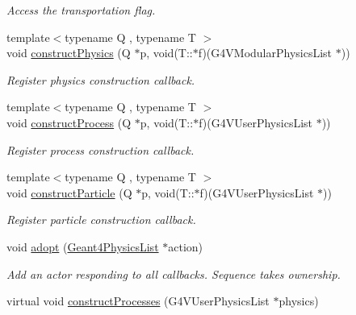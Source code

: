 \begin{DoxyCompactItemize}
\begin{DoxyCompactList}\small\item\em Access the transportation flag. \end{DoxyCompactList}\item 
{\footnotesize template$<$typename Q , typename T $>$ }\\void \hyperlink{class_d_d4hep_1_1_simulation_1_1_geant4_physics_list_action_sequence_a14bd3491087a274666b7d87f148f869c}{construct\+Physics} (Q $\ast$p, void(T\+::$\ast$f)(G4\+V\+Modular\+Physics\+List $\ast$))
\begin{DoxyCompactList}\small\item\em Register physics construction callback. \end{DoxyCompactList}\item 
{\footnotesize template$<$typename Q , typename T $>$ }\\void \hyperlink{class_d_d4hep_1_1_simulation_1_1_geant4_physics_list_action_sequence_a589bbee3287612e519fa1ebfac9a0492}{construct\+Process} (Q $\ast$p, void(T\+::$\ast$f)(G4\+V\+User\+Physics\+List $\ast$))
\begin{DoxyCompactList}\small\item\em Register process construction callback. \end{DoxyCompactList}\item 
{\footnotesize template$<$typename Q , typename T $>$ }\\void \hyperlink{class_d_d4hep_1_1_simulation_1_1_geant4_physics_list_action_sequence_ac93e14a48216ce8a1d9b5b93f642f6ea}{construct\+Particle} (Q $\ast$p, void(T\+::$\ast$f)(G4\+V\+User\+Physics\+List $\ast$))
\begin{DoxyCompactList}\small\item\em Register particle construction callback. \end{DoxyCompactList}\item 
void \hyperlink{class_d_d4hep_1_1_simulation_1_1_geant4_physics_list_action_sequence_a142dc8e16755a619d103c295b7e6445b}{adopt} (\hyperlink{class_d_d4hep_1_1_simulation_1_1_geant4_physics_list}{Geant4\+Physics\+List} $\ast$action)
\begin{DoxyCompactList}\small\item\em Add an actor responding to all callbacks. Sequence takes ownership. \end{DoxyCompactList}\item 
virtual void \hyperlink{class_d_d4hep_1_1_simulation_1_1_geant4_physics_list_action_sequence_a752ad9266718451f2a6b4906a395cbb7}{construct\+Processes} (G4\+V\+User\+Physics\+List $\ast$physics)

\end{DoxyCompactItemize}
